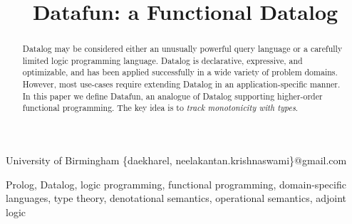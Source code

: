 \documentclass[preprint]{sigplanconf}
\begin{document}
\setlength{\pdfpageheight}{\paperheight}
\setlength{\pdfpagewidth}{\paperwidth}





\title{Datafun: a Functional Datalog}
\subtitle{}

           {University of Birmingham}
           {\{daekharel, neelakantan.krishnaswami\}@gmail.com}

\maketitle


\begin{abstract}
  Datalog may be considered either an unusually powerful query language or a
  carefully limited logic programming language. Datalog is declarative,
  expressive, and optimizable, and has been applied successfully in a wide
  variety of problem domains. However, most use-cases require extending Datalog
  in an application-specific manner. In this paper we define Datafun, an
  analogue of Datalog supporting higher-order functional programming. The key
  idea is to \emph{track monotonicity with types}.

\end{abstract}

%
%
\keywords Prolog, Datalog, logic programming, functional programming, domain-specific languages,
type theory, denotational semantics, operational semantics, adjoint
logic



\end{document}
